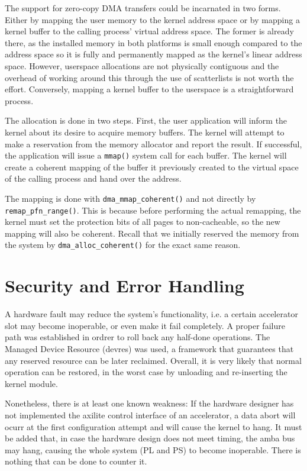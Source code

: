 The support for zero-copy DMA transfers could be incarnated in two forms. Either by mapping the
user memory to the kernel address space or by mapping a kernel buffer to the calling process'
virtual address space. The former is already there, as the installed memory in both platforms
is small enough compared to the address space so it is fully and permanently mapped as the
kernel's linear address space. However, userspace allocations are not physically contiguous
and the overhead of working around this through the use of \glspl{scatterlist} is not worth the effort.
Conversely, mapping a kernel buffer to the userspace is a straightforward process.

The allocation is done in two steps. First, the user application will inform the kernel 
about its desire to acquire memory buffers. The kernel will attempt to make a reservation
from the memory allocator and report the result. If successful, the application will issue
a \texttt{mmap()} system call for each buffer. The kernel will create a coherent mapping of the
buffer it previously created to the virtual space of the calling process and hand over the address.

The mapping is done with \texttt{dma\_mmap\_coherent()} and not directly by \texttt{remap\_pfn\_range()}.
This is because before performing the actual remapping, the kernel must set the protection bits of all pages
to non-cacheable, so the new mapping will also be coherent. Recall that we initially reserved
the memory from the system by \texttt{dma\_alloc\_coherent()} for the exact same reason.


\section{Security and Error Handling}

A hardware fault may reduce the system's functionality, i.e. a certain accelerator slot
may become inoperable, or even make it fail completely. 
A proper failure path was established in ordrer to roll back any half-done operations.
The Managed Device Resource (devres) was used, a framework that guarantees that
any reserved resource can be later reclaimed.
Overall, it is very likely that normal operation can be restored, in the worst case
by unloading and re-inserting the kernel module.

Nonetheless, there is at least one known weakness: If the hardware designer has not implemented
the \gls{axilite} control interface of an accelerator, a data abort will ocurr at the first
configuration attempt and will cause the kernel to hang. It must be added that, in case
the hardware design does not meet timing, the \gls{amba} bus may hang, causing the whole system (PL and PS)
to become inoperable. There is nothing that can be done to counter it.

